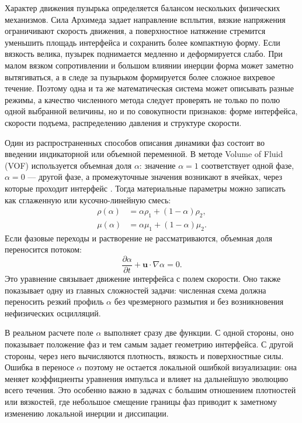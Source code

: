 \documentclass[12pt,a4paper]{article}
\begin{document}
Характер движения пузырька определяется балансом нескольких физических
механизмов. Сила Архимеда задает направление всплытия, вязкие напряжения
ограничивают скорость движения, а поверхностное натяжение стремится уменьшить
площадь интерфейса и сохранить более компактную форму. Если вязкость велика,
пузырек поднимается медленно и деформируется слабо. При малом вязком
сопротивлении и большом влиянии инерции форма может заметно вытягиваться, а в
следе за пузырьком формируется более сложное вихревое течение. Поэтому одна и
та же математическая система может описывать разные режимы, а качество
численного метода следует проверять не только по полю одной выбранной величины, но и по
совокупности признаков: форме интерфейса, скорости подъема, распределению
давления и структуре скорости.

Один из распространенных способов описания динамики фаз состоит во введении
индикаторной или объемной переменной. В методе Volume of Fluid (VOF) используется
объемная доля \(\alpha\): значение \(\alpha=1\) соответствует одной фазе,
\(\alpha=0\) --- другой фазе, а промежуточные значения возникают в ячейках,
через которые проходит интерфейс \cite{Hirt1981}. Тогда материальные параметры
можно записать как сглаженную или кусочно-линейную смесь:
\begin{align}
    \rho(\alpha) &= \alpha\rho_1+(1-\alpha)\rho_2, \\
    \mu(\alpha) &= \alpha\mu_1+(1-\alpha)\mu_2.
\end{align}
Если фазовые переходы и растворение не рассматриваются, объемная доля
переносится потоком:
\begin{equation}
    \frac{\partial\alpha}{\partial t}
    +\mathbf{u}\cdot\nabla\alpha=0.
    \label{eq:review_alpha_transport}
\end{equation}
Это уравнение связывает движение интерфейса с полем скорости. Оно также
показывает одну из главных сложностей задачи: численная схема должна переносить
резкий профиль \(\alpha\) без чрезмерного размытия и без возникновения
нефизических осцилляций.

В реальном расчете поле \(\alpha\) выполняет сразу две функции. С одной
стороны, оно показывает положение фаз и тем самым задает геометрию интерфейса.
С другой стороны, через него вычисляются плотность, вязкость и поверхностные
силы. Ошибка в переносе \(\alpha\) поэтому не остается локальной ошибкой
визуализации: она меняет коэффициенты уравнения импульса и влияет на дальнейшую
эволюцию всего течения. Это особенно важно в задачах с большим отношением
плотностей или вязкостей, где небольшое смещение границы фаз приводит к
заметному изменению локальной инерции и диссипации.
\end{document}
